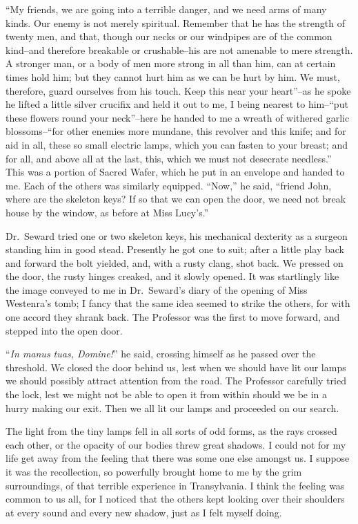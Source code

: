 \documentclass[12pt,openright]{book}
\begin{document}
“My friends, we are going into a terrible danger, and we need arms of many kinds. Our enemy is not merely spiritual. Remember that he has the strength of twenty men, and that, though our necks or our windpipes are of the common kind–and therefore breakable or crushable–his are not amenable to mere strength. A stronger man, or a body of men more strong in all than him, can at certain times hold him; but they cannot hurt him as we can be hurt by him. We must, therefore, guard ourselves from his touch. Keep this near your heart”–as he spoke he lifted a little silver crucifix and held it out to me, I being nearest to him–“put these flowers round your neck”–here he handed to me a wreath of withered garlic blossoms–“for other enemies more mundane, this revolver and this knife; and for aid in all, these so small electric lamps, which you can fasten to your breast; and for all, and above all at the last, this, which we must not desecrate needless.” This was a portion of Sacred Wafer, which he put in an envelope and handed to me. Each of the others was similarly equipped. “Now,” he said, “friend John, where are the skeleton keys? If so that we can open the door, we need not break house by the window, as before at Miss Lucy’s.”

Dr. Seward tried one or two skeleton keys, his mechanical dexterity as a surgeon standing him in good stead. Presently he got one to suit; after a little play back and forward the bolt yielded, and, with a rusty clang, shot back. We pressed on the door, the rusty hinges creaked, and it slowly opened. It was startlingly like the image conveyed to me in Dr. Seward’s diary of the opening of Miss Westenra’s tomb; I fancy that the same idea seemed to strike the others, for with one accord they shrank back. The Professor was the first to move forward, and stepped into the open door.

“\textit{In manus tuas, Domine!}” he said, crossing himself as he passed over the threshold. We closed the door behind us, lest when we should have lit our lamps we should possibly attract attention from the road. The Professor carefully tried the lock, lest we might not be able to open it from within should we be in a hurry making our exit. Then we all lit our lamps and proceeded on our search.

The light from the tiny lamps fell in all sorts of odd forms, as the rays crossed each other, or the opacity of our bodies threw great shadows. I could not for my life get away from the feeling that there was some one else amongst us. I suppose it was the recollection, so powerfully brought home to me by the grim surroundings, of that terrible experience in Transylvania. I think the feeling was common to us all, for I noticed that the others kept looking over their shoulders at every sound and every new shadow, just as I felt myself doing.
\end{document}
